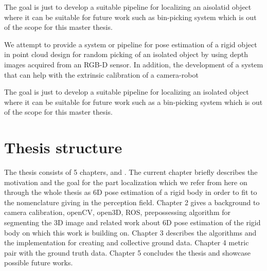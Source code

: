 The goal is just to develop a suitable pipeline for localizing an aisolatid object where it can be suitable for future work such as bin-picking system which is out of the scope for this master thesis.
\fi

We attempt to provide a system or pipeline for pose estimation of a rigid object in point cloud design for random picking of an isolated object by using depth images acquired from an RGB-D sensor. In addition, the development of a system that can help with the extrinsic calibration of a camera-robot

The goal is just to develop a suitable pipeline for localizing an isolated object where it can be suitable for future work such as a bin-picking system which is out of the scope for this master thesis.

\section{Thesis structure}
The thesis consists of 5 chapters,  and . The current chapter briefly describes the motivation and the goal for the part localization which we refer from here on through the whole thesis as 6D pose estimation of a rigid body in order to fit to the nomenclature giving in the perception field. 
Chapter 2 gives a background to camera calibration, openCV, open3D, ROS, prepossessing algorithm for segmenting the 3D image and related work about 6D pose estimation of the rigid body on which this work is building on. Chapter 3 describes the algorithms and the implementation for creating and collective ground data.  Chapter 4 metric pair with the ground truth data. Chapter 5 concludes the thesis and showcase possible future works.

